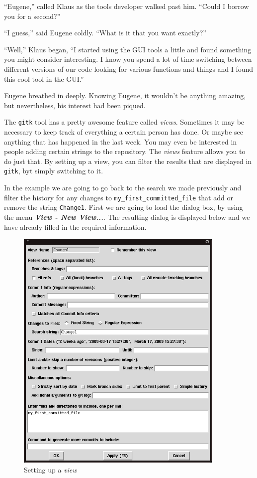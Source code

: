 \begin{trenches}
``Eugene,'' called Klaus as the tools developer walked past him.  ``Could I borrow you for a second?''

``I guess,'' said Eugene coldly.  ``What is it that you want exactly?''

``Well,'' Klaus began, ``I started using the GUI tools a little and found something you might consider interesting.  I know you spend a lot of time switching between different versions of our code looking for various functions and things and I found this cool tool in the GUI.''

Eugene breathed in deeply.  Knowing Eugene, it wouldn't be anything amazing, but nevertheless, his interest had been piqued.
\end{trenches}

The \texttt{gitk} tool has a pretty awesome feature called \emph{views}.  Sometimes it may be necessary to keep track of everything a certain person has done.  Or maybe see anything that has happened in the last week.  You may even be interested in people adding certain strings to the repository.  The \emph{views} feature allows you to do just that.  By setting up a view, you can filter the results that are displayed in \texttt{gitk}, byt simply switching to it.  

In the example we are going to go back to the search we made previously and filter the history for any changes to \texttt{my\_first\_committed\_file} that add or remove the string \texttt{Change1}.  First we are going to load the dialog box, by using the menu \textbf{\emph{View - New View...}}.  The resulting dialog is displayed below and we have already filled in the required information.

\begin{figure}[hbt]
\centering
\includegraphics[width=10cm]{images/f-w5-d13.png}
\caption{Setting up a \emph{view}}
\end{figure} 

